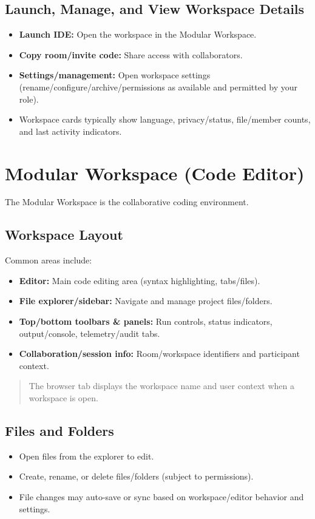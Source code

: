 \documentclass[11pt,a4paper]{article}
\begin{document}
\subsection{Launch, Manage, and View Workspace Details}
\begin{itemize}
  \item \textbf{Launch IDE:} Open the workspace in the Modular Workspace.
  \item \textbf{Copy room/invite code:} Share access with collaborators.
  \item \textbf{Settings/management:} Open workspace settings (rename/configure/archive/permissions as available and permitted by your role).
  \item Workspace cards typically show language, privacy/status, file/member counts, and last activity indicators.
\end{itemize}

\section{Modular Workspace (Code Editor)}

The Modular Workspace is the collaborative coding environment.

\subsection{Workspace Layout}
Common areas include:
\begin{itemize}
  \item \textbf{Editor:} Main code editing area (syntax highlighting, tabs/files).
  \item \textbf{File explorer/sidebar:} Navigate and manage project files/folders.
  \item \textbf{Top/bottom toolbars \& panels:} Run controls, status indicators, output/console, telemetry/audit tabs.
  \item \textbf{Collaboration/session info:} Room/workspace identifiers and participant context.
\end{itemize}

\begin{quote}
The browser tab displays the workspace name and user context when a workspace is open.
\end{quote}

\subsection{Files and Folders}
\begin{itemize}
  \item Open files from the explorer to edit.
  \item Create, rename, or delete files/folders (subject to permissions).
  \item File changes may auto-save or sync based on workspace/editor behavior and settings.
\end{itemize}
\end{document}
